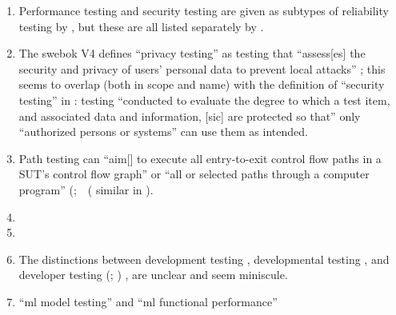 \begin{enumerate}
    \item %
          Performance testing and security testing are given as subtypes of
          reliability testing by \citep{ISO_IEC2023a}, but these are all listed
          separately by \citep[p.~53]{Firesmith2015}.
    \item %
          The \acs{swebok} V4 defines ``privacy testing'' as testing that
          ``assess[es] the security and privacy of users' personal data to
          prevent local attacks'' \citep[p.~5-10]{SWEBOK2024}; this seems to
          overlap (both in scope and name) with the definition of ``security
          testing'' in \citep[p.~7]{IEEE2022}: testing
          ``conducted to evaluate the degree to which a test item, and
          associated data and information, [sic] are protected so that'' only
          ``authorized persons or systems'' can use them as intended.
    \item %
          Path testing can ``aim[] to execute all entry-to-exit control flow
          paths in a SUT's control flow graph'' \citep[p.~5-13]{SWEBOK2024} or
          ``all or selected paths through a computer program''
          \ifnotpaper (\else \fi \citealp[p.~316]{IEEE2017}\ifnotpaper;\ \else\ (\fi%
          similar in \citealp[p.~119]{Patton2006}).
    \item %
          \tourDiscrep{}
    \item %
          \alphaDiscrep{}
    \item %
          The distinctions between development testing \citep[p.~136]{IEEE2017},
          developmental testing \citep[p.~30]{Firesmith2015}, and developer
          testing
          \ifnotpaper
              (\citealp[p.~39]{Firesmith2015}; \citealp[p.~11]{Gerrard2000a})
          \else
              \cite[p.~39]{Firesmith2015}, \cite[p.~11]{Gerrard2000a}
          \fi are unclear and seem miniscule.
    \item %
           \citetISTQB{} 
          ``\acf{ml} model testing'' and ``\acs{ml} functional performance''

\end{enumerate}
